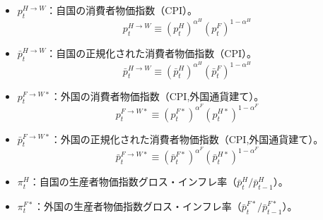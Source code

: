\begin{itemize}
\begin{equation}
            \bar{p}_t^{F*}\equiv\left[\frac{1}{M}\sum_{f'\in F}(p_t^{f'*})^{1-\theta^F}\right]^{\frac{1}{1-\theta^F}}=M^{-\frac{1}{1-\theta^F}}p_t^{F*}
        \end{equation}
    \item
    \label{itm:chapter3_definitions_variables_endogenous_aggregate_p_H_W}
        \(p_t^{H\to W}\)：自国の消費者物価指数（CPI）。
        \begin{equation}
        \label{form:chapter3_definitions_variables_endogenous_aggregate_p_H_W_def}
            p_t^{H\to W}\equiv(p_t^H)^{\alpha^H}(p_t^F)^{1-\alpha^H}
        \end{equation}
    \item
    \label{itm:chapter3_definitions_variables_endogenous_aggregate_p_H_W_bar}
        \(\bar{p}_t^{H\to W}\)：自国の正規化された消費者物価指数（CPI）。
        \begin{equation}
        \label{form:chapter3_definitions_variables_endogenous_aggregate_p_H_W_bar_def}
            \bar{p}_t^{H\to W}\equiv(\bar{p}_t^H)^{\alpha^H}(\bar{p}_t^F)^{1-\alpha^H}
        \end{equation}
    \item
    \label{itm:chapter3_definitions_variables_endogenous_aggregate_p_F_W_star}
        \(p_t^{F\to W*}\)：外国の消費者物価指数（CPI,外国通貨建て）。
        \begin{equation}
        \label{form:chapter3_definitions_variables_endogenous_aggregate_p_F_W_star_def}
            p_t^{F\to W*}\equiv(p_t^{F*})^{\alpha^F}(p_t^{H*})^{1-\alpha^F}
        \end{equation}
    \item
    \label{itm:chapter3_definitions_variables_endogenous_aggregate_p_F_W_star_bar}
        \(\bar{p}_t^{F\to W*}\)：外国の正規化された消費者物価指数（CPI,外国通貨建て）。
        \begin{equation}
        \label{form:chapter3_definitions_variables_endogenous_aggregate_p_F_W_star_bar_def}
            \bar{p}_t^{F\to W*}\equiv(\bar{p}_t^{F*})^{\alpha^F}(\bar{p}_t^{H*})^{1-\alpha^F}
        \end{equation}
    \item
    \label{itm:chapter3_definitions_variables_endogenous_aggregate_pi_H}
        \(\pi_t^H\)：自国の生産者物価指数グロス・インフレ率（\(\bar{p}_t^H/\bar{p}_{t-1}^H\)）。
    \item
    \label{itm:chapter3_definitions_variables_endogenous_aggregate_pi_F_star}
        \(\pi_t^{F*}\)：外国の生産者物価指数グロス・インフレ率（\(\bar{p}_t^{F*}/\bar{p}_{t-1}^{F*}\)）。

\end{itemize}
